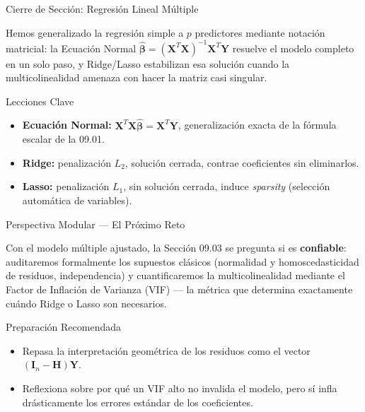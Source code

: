 \documentclass[10pt, aspectratio=169]{beamer}
\begin{document}
\begin{frame}{Cierre de Sección: Regresión Lineal Múltiple}
  \begin{reflexion}
    Hemos generalizado la regresión simple a $p$ predictores mediante notación matricial: la Ecuación Normal $\hat{\boldsymbol\beta}=(\mathbf{X}^T\mathbf{X})^{-1}\mathbf{X}^T\mathbf{Y}$ resuelve el modelo completo en un solo paso, y Ridge/Lasso estabilizan esa solución cuando la multicolinealidad amenaza con hacer la matriz casi singular.
  \end{reflexion}

  \vspace{0.2cm}
  \pause
  \begin{block}{Lecciones Clave}
    \begin{itemize}\itemsep=0.08cm
      \item \textbf{Ecuación Normal:} $\mathbf{X}^T\mathbf{X}\hat{\boldsymbol\beta}=\mathbf{X}^T\mathbf{Y}$, generalización exacta de la fórmula escalar de la 09.01.
      \item \textbf{Ridge:} penalización $L_2$, solución cerrada, contrae coeficientes sin eliminarlos.
      \item \textbf{Lasso:} penalización $L_1$, sin solución cerrada, induce \emph{sparsity} (selección automática de variables).
    \end{itemize}
  \end{block}
\end{frame}

\begin{frame}{Perspectiva Modular --- El Próximo Reto}
  \scriptsize
  \begin{retoclase}
    Con el modelo múltiple ajustado, la Sección 09.03 se pregunta si es \textbf{confiable}: auditaremos formalmente los supuestos clásicos (normalidad y homoscedasticidad de residuos, independencia) y cuantificaremos la multicolinealidad mediante el Factor de Inflación de Varianza (VIF) --- la métrica que determina exactamente cuándo Ridge o Lasso son necesarios.
  \end{retoclase}

  \vspace{0.08cm}
  \pause
  \begin{alertblock}{Preparación Recomendada}
    \begin{itemize}\itemsep=0.06cm
      \item Repasa la interpretación geométrica de los residuos como el vector $(\mathbf{I}_n-\mathbf{H})\mathbf{Y}$.
      \item Reflexiona sobre por qué un VIF alto no invalida el modelo, pero sí infla drásticamente los errores estándar de los coeficientes.
    \end{itemize}
  \end{alertblock}
\end{frame}
\end{document}
